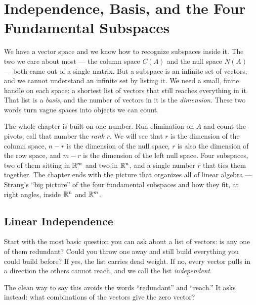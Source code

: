 \chapter{Independence, Basis, and the Four Fundamental Subspaces}
\label{ch:4}

We have a vector space and we know how to recognize subspaces inside it. The two we care about most --- the column space $C(A)$ and the null space $N(A)$ --- both came out of a single matrix. But a subspace is an infinite set of vectors, and we cannot understand an infinite set by listing it. We need a small, finite handle on each space: a shortest list of vectors that still reaches everything in it. That list is a \emph{basis}, and the number of vectors in it is the \emph{dimension}. These two words turn vague spaces into objects we can count.

The whole chapter is built on one number. Run elimination on $A$ and count the pivots; call that number the \emph{rank} $r$. We will see that $r$ is the dimension of the column space, $n-r$ is the dimension of the null space, $r$ is also the dimension of the row space, and $m-r$ is the dimension of the left null space. Four subspaces, two of them sitting in $\mathbb{R}^m$ and two in $\mathbb{R}^n$, and a single number $r$ that ties them together. The chapter ends with the picture that organizes all of linear algebra --- Strang's ``big picture'' of the four fundamental subspaces and how they fit, at right angles, inside $\mathbb{R}^n$ and $\mathbb{R}^m$.

\section{Linear Independence}

Start with the most basic question you can ask about a list of vectors: is any one of them redundant? Could you throw one away and still build everything you could build before? If yes, the list carries dead weight. If no, every vector pulls in a direction the others cannot reach, and we call the list \emph{independent}.

The clean way to say this avoids the words ``redundant'' and ``reach.'' It asks instead: what combinations of the vectors give the zero vector?


